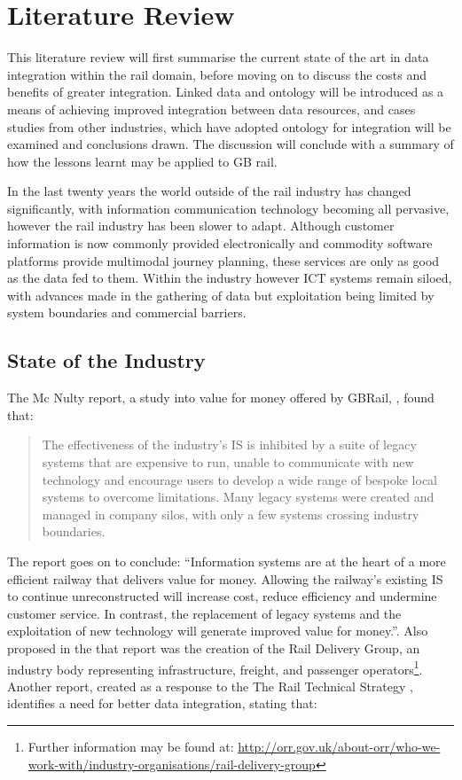 \chapter{Literature Review}\label{ch:litreview}
This literature review will first summarise the current state of the art in data integration within the rail domain, before moving on to discuss the costs and benefits of greater integration. Linked data and ontology will be introduced as a means of achieving improved integration between data resources, and cases studies from other industries, which have adopted ontology for integration will be examined and conclusions drawn. The discussion will conclude with a summary of how the lessons learnt may be applied to GB rail.

In the last twenty years the world outside of the rail industry has changed significantly, with information communication technology becoming all pervasive, however the rail industry has been slower to adapt. Although customer information is now commonly provided electronically and commodity software platforms provide multimodal journey planning, these services are only as good as the data fed to them. Within the industry however ICT systems remain siloed, with advances made in the gathering of data but exploitation being limited by system boundaries and commercial barriers. 

\section{State of the Industry}
\label{state}

The Mc Nulty report, a study into value for money offered by GBRail, \citep{DepartmentforTransport2011}, found that:
\begin{quote}
    The effectiveness of the industry’s IS is inhibited by a suite of legacy systems that are expensive to run, unable to communicate with new technology and encourage users to develop a wide range of bespoke local systems to overcome limitations. Many legacy systems were created and managed in company silos, with only a few systems crossing industry boundaries.
\end{quote}

The report goes on to conclude: ``Information systems are at the heart of a more efficient railway that delivers value for money. Allowing the railway’s existing IS to continue unreconstructed will increase cost, reduce efficiency and undermine customer service. In contrast, the replacement of legacy systems and the exploitation of new technology will generate improved value for money.''. Also proposed in the that report was the creation of the Rail Delivery Group, an industry body representing infrastructure, freight, and passenger operators\footnote{Further information may be found at: \url{http://orr.gov.uk/about-orr/who-we-work-with/industry-organisations/rail-delivery-group}}. Another report, created as a response to the The Rail Technical Strategy \citep{TechnicalStrategyLeadershipGroup2012b}, identifies a need for better data integration, stating that:

